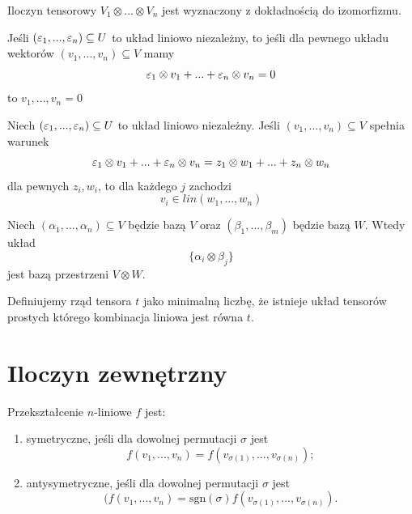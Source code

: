 \documentclass[11pt, a4paper]{article}
\begin{document}
\begin{theorem}
	Iloczyn tensorowy \(V_1 \otimes... \otimes V_n\) jest wyznaczony z
	dokładnością do izomorfizmu.
\end{theorem}

\begin{remark}
	Jeśli \((\varepsilon_1, ..., \varepsilon_n) \subseteq U\) to układ liniowo niezależny, to jeśli dla
	pewnego układu wektorów \((v_1, ..., v_n) \subseteq V\) mamy
	\[
	    \varepsilon_1 \otimes v_1 + ... + \varepsilon_n \otimes v_n = 0
	\]
	to \(v_1, ..., v_n = 0\)
\end{remark}
\begin{remark}
	Niech \((\varepsilon_1, ..., \varepsilon_n) \subseteq U\) to układ liniowo niezależny.
	Jeśli \((v_1, ..., v_n) \subseteq V\) spełnia warunek
	\[
	\varepsilon_1 \otimes v_1 + ... + \varepsilon_n \otimes v_n = z_1 \otimes w_1 + ... + z_n \otimes w_n
	\]
	dla pewnych \(z_i, w_i\), to dla każdego \(j\) zachodzi
	\[
	    v_i \in lin(w_1, ..., w_n)
	\]
\end{remark}

\begin{theorem}
	Niech \((\alpha_1, ..., \alpha_n) \subseteq V\) będzie bazą \(V\) oraz
	\((\beta_1, ..., \beta_m)\) będzie bazą \(W\). Wtedy układ
	\[
	\{ \alpha_i \otimes \beta_j \}
	\]
	jest bazą przestrzeni \(V \otimes W\).
\end{theorem}

\begin{definition}
	Definiujemy rząd tensora \(t\) jako minimalną liczbę, że istnieje układ tensorów
	prostych którego kombinacja liniowa jest równa \(t\).
\end{definition}
\section{Iloczyn zewnętrzny}
\begin{definition}
    Przekształcenie \(n\)-liniowe \(f\) jest:
    \begin{enumerate}
        \item symetryczne, jeśli dla dowolnej permutacji \(\sigma\) jest
        \[f(v_1, ..., v_n) = f(v_{\sigma(1)}, ..., v_{\sigma(n)});\]

        \item antysymetryczne, jeśli dla dowolnej permutacji \(\sigma\) jest
        \[(f(v_1, ..., v_n) = \text{sgn}(\sigma)f(v_{\sigma(1)}, ..., v_{\sigma(n)}).\]
    \end{enumerate}
\end{definition}
\end{document}
